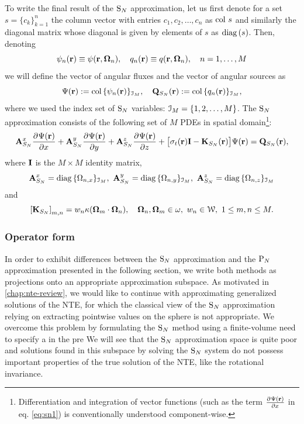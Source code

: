 To write  the final result of the $\text{S}_{N}$ approximation, let us first denote for a set $s = \{c_k\}_{k=1}^n$ the column
vector with entries $c_1,c_2,\ldots,c_n$ as $\operatorname{col\,} s$ and similarly the diagonal matrix whose diagonal is
given by elements of $s$ as $\operatorname{diag\,}(s)$. Then, denoting
\begin{equation}\label{eq:sn_vecs}
\psi_n(\mathbf{r}) \equiv \psi(\mathbf{r},\mathbf{\Omega}_n), \quad q_n(\mathbf{r}) \equiv
q(\mathbf{r},\mathbf{\Omega}_n),\quad n = 1,\ldots, M	
\end{equation}
we will define the vector of angular fluxes and the vector of angular sources as
\begin{equation}\label{eq:sn_vars}
\Psi(\mathbf{r}) := \operatorname{col\,}\{\psi_n(\mathbf{r})\}_{\mathcal{I}_{M}},\quad
\mathbf{Q}_{S_N}(\mathbf{r}) := \operatorname{col\,}\{q_n(\mathbf{r})\}_{\mathcal{I}_{M}},
\end{equation}
where we used the index set of $\text{S}_{N}$ variables: $\mathcal{I}_{M} = \{1,2,\ldots,M\}$.
The $\text{S}_{N}$ approximation consists of the following set of $M$ PDEs in spatial domain\footnote{Differentiation and
integration of vector functions (such as the term $\frac{\partial^{}\Psi(\mathbf{r})}{\partial x^{}}$ in eq. \eqref{eq:sn1}) is conventionally
understood component-wise.}:
\begin{equation}\label{eq:sn1} 
\mathbf{A}_{S_N}^x\frac{\partial^{}\Psi(\mathbf{r})}{\partial x^{}} + \mathbf{A}_{S_N}^y\frac{\partial^{}\Psi(\mathbf{r})}{\partial y^{}} +
\mathbf{A}_{S_N}^z\frac{\partial^{}\Psi(\mathbf{r})}{\partial z^{}} + \bigl[\sigma_t(\mathbf{r})\mathbf{I} - \mathbf{K}_{S_N}(\mathbf{r})\bigr]\Psi(\mathbf{r}) = \mathbf{Q}_{S_N}(\mathbf{r}),
\end{equation}
where $\mathbf{I}$ is the $M\times M$ identity matrix,
$$
	\mathbf{A}_{S_N}^x = \operatorname{diag\,}\{\Omega_{n,x}\}_{\mathcal{I}_{M}},\ \mathbf{A}_{S_N}^y = \operatorname{diag\,}\{\Omega_{n,y}\}_{\mathcal{I}_{M}},\
	\mathbf{A}_{S_N}^z = \operatorname{diag\,}\{\Omega_{n,z}\}_{\mathcal{I}_{M}}
$$
and
\begin{equation}\label{eq:SNK}
	\left[\mathbf{K}_{S_N}\right]_{m,n} = w_n \kappa(\mathbf{\Omega}_m\cdot\mathbf{\Omega}_n),\quad
	\mathbf{\Omega}_n,\mathbf{\Omega}_m\in \omega,\ w_n\in \mathcal{W},\ 1 \leq m,n \leq M.
\end{equation}


\subsubsection{Operator form}\label{sec:opsn}
In order to exhibit differences between the $\text{S}_{N}$ approximation and the $\text{P}_{N}$ approximation presented in the following
section, we write both methods as projections onto an appropriate approximation subspace. As motivated in
\cref{chap:nte-review}, we would like to continue with approximating generalized solutions of the NTE, for which the
classical view of the $\text{S}_{N}$ approximation relying on extracting pointwise values on the sphere is not appropriate. We
overcome this problem by formulating the $\text{S}_{N}$ method using a finite-volume need to specify a in the pre We will see
that the $\text{S}_{N}$ approximation space is quite poor and solutions found in this subspace by solving the $\text{S}_{N}$ system do not possess important properties of the true solution of the NTE, like the rotational invariance.

